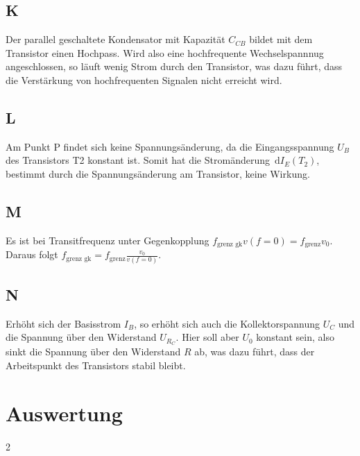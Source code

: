 \documentclass[a4paper,10pt]{article}
\newcommand{\td}{\,\text{d}}
\numberwithin{equation}{section}
\begin{document}
\begin{multicols}{2}
        \subsection{K}
        Der parallel geschaltete Kondensator mit Kapazität $C_{CB}$ bildet mit dem Transistor einen Hochpass.
        Wird also eine hochfrequente Wechselspannnug angeschlossen, so läuft wenig Strom durch den Transistor, was dazu führt, dass die Verstärkung von hochfrequenten Signalen nicht erreicht wird.

        \subsection{L}
        Am Punkt P findet sich keine Spannungsänderung, da die Eingangsspannung $U_B$ des Transistors T2 konstant ist.
        Somit hat die Stromänderung $\td I_E\left(T_2\right)$, bestimmt durch die Spannungsänderung am Transistor, keine Wirkung.

        \subsection{M}
        Es ist bei Transitfrequenz unter Gegenkopplung $f_\text{grenz gk}v\left(f=0\right)=f_\text{grenz}v_0$.
        Daraus folgt $f_\text{grenz gk}=f_\text{grenz}\tfrac{v_0}{v\left(f=0\right)}$.

        \subsection{N}
        Erhöht sich der Basisstrom $I_B$, so erhöht sich auch die Kollektorspannung $U_C$ und die Spannung über den Widerstand $U_{R_C}$.
        Hier soll aber $U_0$ konstant sein, also sinkt die Spannung über den Widerstand $R$ ab, was dazu führt, dass der Arbeitspunkt des Transistors stabil bleibt.

        \clearpage
        \section{Auswertung}

\end{multicols}{2}

\clearpage
\listoffigures
\listoftables



\end{document}
